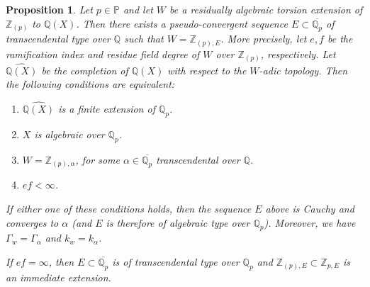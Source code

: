 \documentclass[10pt]{article}
\numberwithin{equation}{section}
\newtheorem{Prop}[equation]{Proposition}
\theoremstyle{definition}\newtheorem{Def}[equation]{Definition}
\theoremstyle{definition}\newtheorem{Ques}[equation]{Question}
\newcommand{\Q}{\mathbb{Q}}
\newcommand{\Z}{\mathbb{Z}}
\newcommand{\PP}{\mathbb{P}}
\newcommand{\oQp}{\overline{\Q_p}}
\begin{document}
\begin{Prop}\label{ratQ(X)}
Let $p\in\PP$ and let $W$ be a residually algebraic torsion extension of $\Z_{(p)}$ to $\Q(X)$.  Then there exists a pseudo-convergent sequence $E\subset\oQp$ of transcendental type over $\Q$ such that $W=\Z_{(p),E}$. More precisely, let $e,f$ be the ramification index and residue field degree of $W$ over $\Z_{(p)}$, respectively. Let $\widehat{\Q(X)}$ be the completion of $\Q(X)$ with respect to the $W$-adic topology. Then the following conditions are equivalent:
\begin{enumerate}
\item $\widehat{\Q(X)}$ is a finite extension of $\Q_p$.
\item $X$ is algebraic over $\Q_p$.
\item $W=\Z_{(p),\alpha}$, for some $\alpha\in\oQp$ transcendental over $\Q$. 
\item $ef<\infty$.
\end{enumerate}
If either one of these conditions holds, then the sequence $E$ above is Cauchy and converges to $\alpha$ (and $E$ is therefore of algebraic type over $\Q_p$). Moreover, we have $\Gamma_w=\Gamma_{\alpha}$ and $k_w=k_{\alpha}$.

If $ef=\infty$, then $E\subset\oQp$ is of transcendental type over $\Q_p$ and $\Z_{(p),E}\subset\Z_{p,E}$ is an immediate extension.
\end{Prop}
\end{document}
